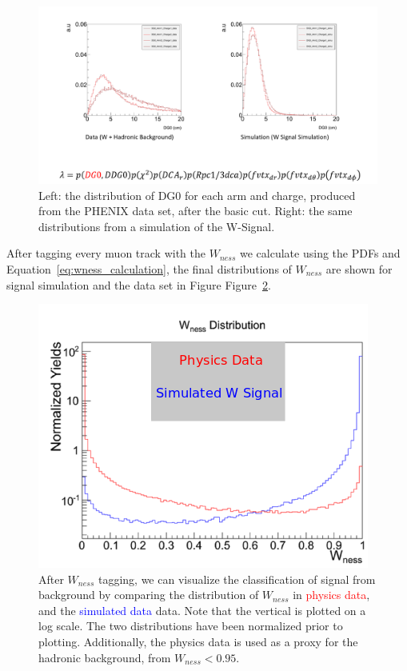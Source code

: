 \begin{figure}
  \centering
  \includegraphics[width=\linewidth,trim=4 4 4 4,clip]{./figures/pdf_DG0.png}
  \caption{
    Left: the distribution of DG0 for each arm and charge, produced from the
    PHENIX data set, after the basic cut. Right: the same distributions from a
    simulation of the W-Signal.
  }
  \label{fig:pdf_DG0}
\end{figure}

\edithere{}

After tagging every muon track with the $W_{ness}$ we calculate using the PDFs
and Equation~\ref{eq:wness_calculation}, the final distributions of $W_{ness}$
are shown for signal simulation and the data set in Figure
Figure~\ref{fig:wness_distribution}.

\begin{figure}
  \centering
  \includegraphics[width=0.7\linewidth]{./figures/wness_sig_bak.png}
  \caption{
    After $W_{ness}$ tagging, we can visualize the classification of signal from
    background by comparing the distribution of $W_{ness}$ in
    \textcolor{red}{physics data}, and the \textcolor{blue}{simulated data}
    data. Note that the vertical is plotted on a log scale. The two
    distributions have been normalized prior to plotting. Additionally, the
    physics data is used as a proxy for the hadronic background, from $W_{ness}
    < 0.95$.
  }
  \label{fig:wness_distribution}
\end{figure}

